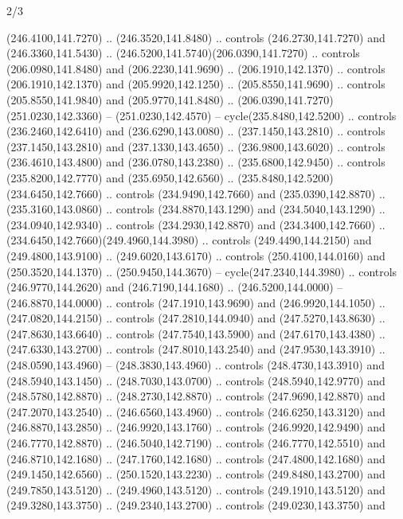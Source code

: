 \begin{flagdescription}{2/3}
\begin{scope}[xshift=0.5\flaglength,yshift=0.5\flagwidth,scale=\flagwidth/259.2]
\begin{scope}[y=0.8pt, x=0.8pt, yscale=-1,shift={(-243,-162)}]
      (246.4100,141.7270) .. (246.3520,141.8480) .. controls (246.2730,141.7270) and
      (246.3360,141.5430) .. (246.5200,141.5740)(206.0390,141.7270) .. controls
      (206.0980,141.8480) and (206.2230,141.9690) .. (206.1910,142.1370) .. controls
      (206.1910,142.1370) and (205.9920,142.1250) .. (205.8550,141.9690) .. controls
      (205.8550,141.9840) and (205.9770,141.8480) ..
      (206.0390,141.7270)(251.0230,142.3360) -- (251.0230,142.4570) --
      cycle(235.8480,142.5200) .. controls (236.2460,142.6410) and
      (236.6290,143.0080) .. (237.1450,143.2810) .. controls (237.1450,143.2810) and
      (237.1330,143.4650) .. (236.9800,143.6020) .. controls (236.4610,143.4800) and
      (236.0780,143.2380) .. (235.6800,142.9450) .. controls (235.8200,142.7770) and
      (235.6950,142.6560) .. (235.8480,142.5200)(234.6450,142.7660) .. controls
      (234.9490,142.7660) and (235.0390,142.8870) .. (235.3160,143.0860) .. controls
      (234.8870,143.1290) and (234.5040,143.1290) .. (234.0940,142.9340) .. controls
      (234.2930,142.8870) and (234.3400,142.7660) ..
      (234.6450,142.7660)(249.4960,144.3980) .. controls (249.4490,144.2150) and
      (249.4800,143.9100) .. (249.6020,143.6170) .. controls (250.4100,144.0160) and
      (250.3520,144.1370) .. (250.9450,144.3670) -- cycle(247.2340,144.3980) ..
      controls (246.9770,144.2620) and (246.7190,144.1680) .. (246.5200,144.0000) --
      (246.8870,144.0000) .. controls (247.1910,143.9690) and (246.9920,144.1050) ..
      (247.0820,144.2150) .. controls (247.2810,144.0940) and (247.5270,143.8630) ..
      (247.8630,143.6640) .. controls (247.7540,143.5900) and (247.6170,143.4380) ..
      (247.6330,143.2700) .. controls (247.8010,143.2540) and (247.9530,143.3910) ..
      (248.0590,143.4960) -- (248.3830,143.4960) .. controls (248.4730,143.3910) and
      (248.5940,143.1450) .. (248.7030,143.0700) .. controls (248.5940,142.9770) and
      (248.5780,142.8870) .. (248.2730,142.8870) .. controls (247.9690,142.8870) and
      (247.2070,143.2540) .. (246.6560,143.4960) .. controls (246.6250,143.3120) and
      (246.8870,143.2850) .. (246.9920,143.1760) .. controls (246.9920,142.9490) and
      (246.7770,142.8870) .. (246.5040,142.7190) .. controls (246.7770,142.5510) and
      (246.8710,142.1680) .. (247.1760,142.1680) .. controls (247.4800,142.1680) and
      (249.1450,142.6560) .. (250.1520,143.2230) .. controls (249.8480,143.2700) and
      (249.7850,143.5120) .. (249.4960,143.5120) .. controls (249.1910,143.5120) and
      (249.3280,143.3750) .. (249.2340,143.2700) .. controls (249.0230,143.3750) and

\end{scope}
\end{scope}
\end{flagdescription}
